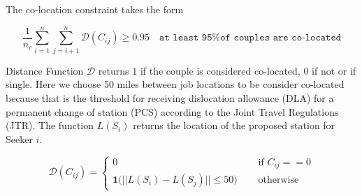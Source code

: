 The co-location constraint takes the form

\[ \frac{1}{n_c} \sum_{i=1}^{n}\sum_{j=i+1}^{n} \mathcal{D}(C_{ij}) \geq 0.95 \quad \texttt{at least 95\% of couples are co-located} \]

Distance Function $\mathcal{D}$ returns $1$ if the couple is considered co-located, 0 if not or if single. Here we choose 50 miles between job locations to be consider co-located because that is the threshold for receiving dislocation allowance (DLA) for a permanent change of station (PCS) according to the Joint Travel Regulations (JTR). The function $L(S_i)$ returns the location of the proposed station for Seeker $i$. 

\[\mathcal{D}(C_{ij}) = \begin{cases}
0 \quad & \text{ if } C_{ij}== 0 \\
 \mathbf{1}\big( || L(S_i) - L(S_j) || \leq 50 \big) \quad & \text{ otherwise }
 \end{cases}\]


